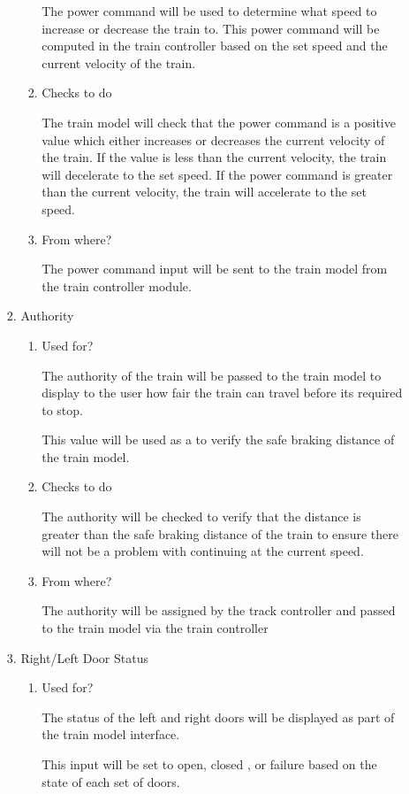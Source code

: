 \documentclass[11pt]{article}
\begin{document}
\begin{enumerate}
\begin{enumerate}
\begin{enumerate}
\begin{enumerate}
The power command will be used to determine what speed to increase or decrease the train to. This power command will be computed in the train controller based on the set speed and the current velocity of the train.
\item Checks to do
\label{sec-3-1-4-2-1-1-2}

The train model will check that the power command is a positive value which either increases or decreases the current velocity of the train. If the value is less than the current velocity, the train will decelerate to the set speed. 
If the power command is greater than the current velocity, the train will accelerate to the set speed.
\item From where?
\label{sec-3-1-4-2-1-1-3}

The power command input will be sent to the train model from the train controller module.
\end{enumerate}
\item Authority
\label{sec-3-1-4-2-1-2}
\begin{enumerate}
\item Used for?
\label{sec-3-1-4-2-1-2-1}

The authority of the train will be passed to the train model to display to the user how fair the train can travel before its required to stop. 

This value will be used as a to verify the safe braking distance of the train model.
\item Checks to do
\label{sec-3-1-4-2-1-2-2}

The authority will be checked to verify that the distance is greater than the safe braking distance of the train to ensure there will not be a problem with continuing at the current speed.
\item From where?
\label{sec-3-1-4-2-1-2-3}

The authority will be assigned by the track controller and passed to the train model via the train controller
\end{enumerate}
\item Right/Left Door Status
\label{sec-3-1-4-2-1-3}
\begin{enumerate}
\item Used for?
\label{sec-3-1-4-2-1-3-1}

The status of the left and right doors will be displayed as part of the train model interface. 

This input will be set to open, closed , or failure based on the state of each set of doors. 


\end{enumerate}
\end{enumerate}
\end{enumerate}
\end{enumerate}
\end{document}
